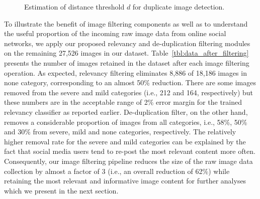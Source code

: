 \documentclass{iscram}
\begin{document}
\begin{figure}[!htb]
\centering
{}
\caption{Estimation of distance threshold $d$ for duplicate image detection.}
\label{fig:duplicate}
\end{figure}%
To illustrate the benefit of image filtering components as well as to understand the useful proportion of the incoming raw image data from online social networks, we apply our proposed relevancy and de-duplication filtering modules on the remaining 27,526 images in our dataset. Table~\ref{tbl:data_after_filtering} presents the number of images retained in the dataset after each image filtering operation. As expected, relevancy filtering eliminates 8,886 of 18,186 images in none category, corresponding to an almost 50\% reduction. There are some images removed from the severe and mild categories (i.e., 212 and 164, respectively) but these numbers are in the acceptable range of 2\% error margin for the trained relevancy classifier as reported earlier. De-duplication filter, on the other hand, removes a considerable proportion of images from all categories, i.e., 58\%, 50\% and 30\% from severe, mild and none categories, respectively. The relatively higher removal rate for the severe and mild categories can be explained by the fact that social media users tend to re-post the most relevant content more often. Consequently, our image filtering pipeline reduces the size of the raw image data collection by almost a factor of 3 (i.e., an overall reduction of 62\%) while retaining the most relevant and informative image content for further analyses which we present in the next section.
\end{document}
